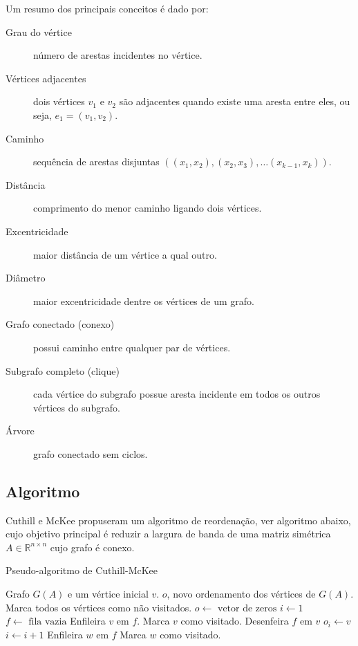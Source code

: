 Um resumo dos principais conceitos é dado por:
\begin{description}
    \item[Grau do vértice] número de arestas incidentes no vértice.
    \item[Vértices adjacentes]  dois vértices $v_1$ e $v_2$ são adjacentes quando existe uma aresta entre eles, ou seja, $e_1 = (v_1, v_2)$.
    \item[Caminho] sequência de arestas disjuntas $\left( (x_1, x_2), (x_2, x_3), \ldots (x_{k - 1}, x_k) \right)$.
    \item[Distância] comprimento do menor caminho ligando dois vértices.
    \item[Excentricidade] maior distância de um vértice a qual outro.
    \item[Diâmetro] maior excentricidade dentre os vértices de um grafo.
    \item[Grafo conectado (conexo)] possui caminho entre qualquer par de vértices.
    \item[Subgrafo completo (clique)] cada vértice do subgrafo possue aresta incidente em todos os outros vértices do subgrafo.
    \item[Árvore] grafo conectado sem ciclos.
\end{description}
\subsection{Algoritmo}
Cuthill e McKee \cite{Cuthill:1969:ReducingBandwidth} propuseram um algoritmo de
reordenação, ver algoritmo abaixo, cujo objetivo principal é reduzir a largura
de banda de uma matriz simétrica $A \in \mathbb{R}^{n \times n}$ cujo grafo
é conexo.

\begin{algorithm}[H]
    \caption{Pseudo-algoritmo de Cuthill-McKee}
    \label{alg:rcm}
    \begin{algorithmic}[1]
        \REQUIRE Grafo $G(A)$ e um vértice inicial $v$.
        \ENSURE $o$, novo ordenamento dos vértices de $G(A)$.
        \STATE Marca todos os vértices como não visitados.
        \STATE $o \longleftarrow \text{ vetor de zeros}$
        \STATE $i \longleftarrow 1$
        \STATE $f \longleftarrow \text{ fila vazia}$
        \STATE Enfileira $v$ em $f$.
        \STATE Marca $v$ como visitado.
            \STATE Desenfeira $f$ em $v$
            \STATE $o_i \longleftarrow v$
            \STATE $i \longleftarrow i + 1$
                    \STATE Enfileira $w$ em $f$
                    \STATE Marca $w$ como visitado.
                \ENDIF
            \ENDFOR
        \ENDWHILE
    \end{algorithmic}
\end{algorithm}

